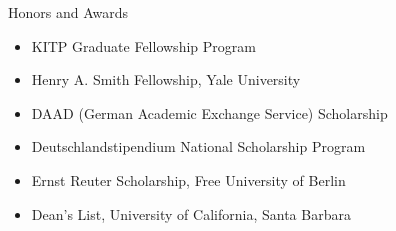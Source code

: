 \documentclass[11pt]{resume} %
\begin{document}
\begin{rSection}{Honors and Awards}
  \begin{itemize}[leftmargin=1.0cm, topsep=0pt,itemsep=0pt,partopsep=0pt, parsep=0pt]
    \item KITP Graduate Fellowship Program
    \item Henry A. Smith Fellowship, Yale University
    \item DAAD (German Academic Exchange Service) Scholarship
    \item Deutschlandstipendium National Scholarship Program
    \item Ernst Reuter Scholarship, Free University of Berlin
    \item Dean's List, University of California, Santa Barbara
  \end{itemize}
\end{rSection}
\end{document}
